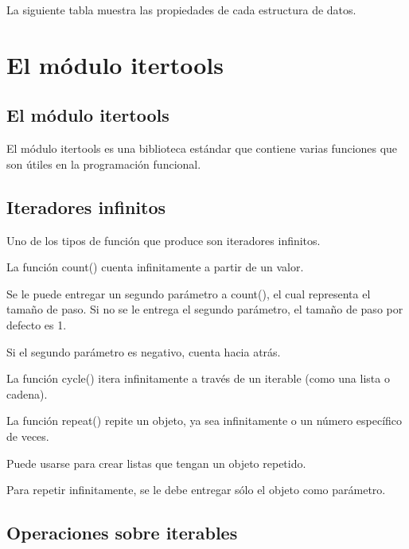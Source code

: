 \documentclass{report}
\begin{document}
La siguiente tabla muestra las propiedades de cada estructura de datos.


\clearpage\chapter{El módulo itertools}

\section{El módulo itertools}

El módulo itertools es una biblioteca estándar que contiene varias funciones que son útiles en la programación funcional.


\section{Iteradores infinitos}

Uno de los tipos de función que produce son iteradores infinitos.

La función count() cuenta infinitamente a partir de un valor.


Se le puede entregar un segundo parámetro a count(), el cual representa el tamaño de paso. Si no se le entrega el segundo parámetro, el tamaño de paso por defecto es 1.


Si el segundo parámetro es negativo, cuenta hacia atrás.


La función cycle() itera infinitamente a través de un iterable (como una lista o cadena).



La función repeat() repite un objeto, ya sea infinitamente o un número específico de veces.


Puede usarse para crear listas que tengan un objeto repetido.


Para repetir infinitamente, se le debe entregar sólo el objeto como parámetro.


\section{Operaciones sobre iterables}
\end{document}

